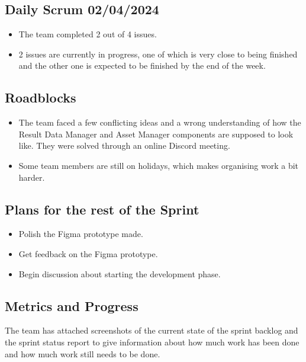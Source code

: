 \documentclass[12pt]{report}
\begin{document}
\subsection*{Daily Scrum 02/04/2024}

\begin{itemize}
    \item The team completed 2 out of 4 issues.
    \item 2 issues are currently in progress, one of which is very close to being finished and the other one is expected to be finished by the end of the week.
\end{itemize}

\subsection*{Roadblocks}
\begin{itemize}
    \item The team faced a few conflicting ideas and a wrong understanding of how the Result Data Manager and Asset Manager components are supposed to look like. They were solved through an online Discord meeting.
    \item Some team members are still on holidays, which makes organising work a bit harder.
\end{itemize}

\subsection*{Plans for the rest of the Sprint}
\begin{itemize}
    \item Polish the Figma prototype made.
    \item Get feedback on the Figma prototype.
    \item Begin discussion about starting the development phase.
\end{itemize}

\subsection*{Metrics and Progress}
The team has attached screenshots of the current state of the sprint backlog and the sprint status report to give information about how much work has been done and how much work still needs to be done.
\end{document}
